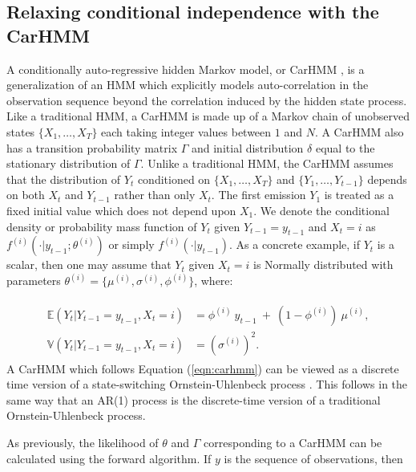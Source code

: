 \subsection{Relaxing conditional independence with the CarHMM}
\label{subsec:CarHMM}

A conditionally auto-regressive hidden Markov model, or CarHMM \citep{Lawler:2019}, is a generalization of an HMM which explicitly models auto-correlation in the observation sequence beyond the correlation induced by the hidden state process. Like a traditional HMM, a CarHMM is made up of a Markov chain of unobserved states $\{X_1,\ldots,X_T\}$ each taking integer values between $1$ and $N$. A CarHMM also has a transition probability matrix $\Gamma$ and initial distribution $\delta$ equal to the stationary distribution of $\Gamma$. Unlike a traditional HMM, the CarHMM assumes that the distribution of $Y_t$ conditioned on $\{X_1,\ldots, X_T\}$ and $\{Y_1,\ldots, Y_{t-1}\}$ depends on both $X_t$ and $Y_{t-1}$ rather than only $X_t$. The first emission $Y_1$ is treated as a fixed initial value which does not depend upon $X_1$. We denote the conditional density or probability mass function of $Y_t$ given $Y_{t-1} = y_{t-1}$ and $X_t=i$ as $f^{(i)}(\cdot | y_{t-1}; \theta^{(i)})$ or simply $f^{(i)}(\cdot | y_{t-1})$. 
As a concrete example, if $Y_t$ is a scalar, then one may assume that $Y_t$ given $X_t = i$ is Normally distributed with parameters $\theta^{(i)} = \{\mu^{(i)},\sigma^{(i)},\phi^{(i)}\}$, where:

\begin{align}
\label{eqn:carhmm}
    \begin{split}
    \mathbb{E}(Y_{t}|Y_{t-1} = y_{t-1},X_t=i) &= \phi^{(i)} ~ y_{t-1} ~+ ~(1-\phi^{(i)})  ~\mu^{(i)}, \\
    \mathbb{V}(Y_t| Y_{t-1} = y_{t-1},X_t=i) &= (\sigma^{(i)})^2.
    \end{split}
\end{align}
%
A CarHMM which follows Equation (\ref{eqn:carhmm}) can be viewed as a discrete time version of a state-switching Ornstein-Uhlenbeck process \citep{Michelot:2019}. This follows in the same way that an AR(1) process is the discrete-time version of a traditional Ornstein-Uhlenbeck process. 

As previously, the likelihood of $\theta$ and $\Gamma$ corresponding to a CarHMM can be calculated using the forward algorithm. If $y$ is the sequence of observations, then

